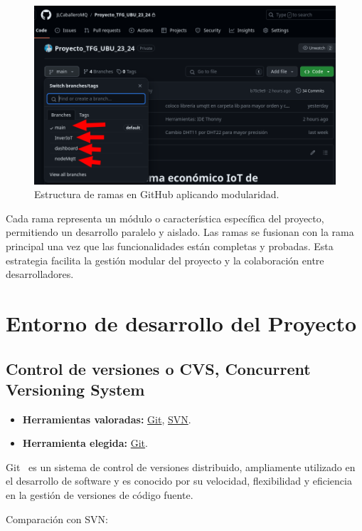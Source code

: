 \begin{figure}[h]
    \centering
    \includegraphics[width=1\textwidth]{img/desarrollo/modularidad.png}
	\caption{Estructura de ramas en GitHub aplicando modularidad. }
\end{figure}
Cada rama representa un módulo o característica específica del proyecto, permitiendo un desarrollo paralelo y aislado. Las ramas se fusionan con la rama principal una vez que las funcionalidades están completas y probadas. Esta estrategia facilita la gestión modular del proyecto y la colaboración entre desarrolladores.


\section{Entorno de desarrollo del Proyecto}
\subsection{Control de versiones o CVS, Concurrent Versioning System}\label{4:controlVersiones}
\begin{itemize}
    \item \textbf{Herramientas valoradas:} \href{https://git-scm.com/}{Git}, \href{https://subversion.apache.org/}{SVN}.
    \item \textbf{Herramienta elegida:} \href{https://git-scm.com/}{Git}.
\end{itemize}
Git~\cite{misc:Git} es un sistema de control de versiones distribuido, ampliamente utilizado en el desarrollo de software y es conocido por su velocidad, flexibilidad y eficiencia en la gestión de versiones de código fuente.

Comparación con SVN:

